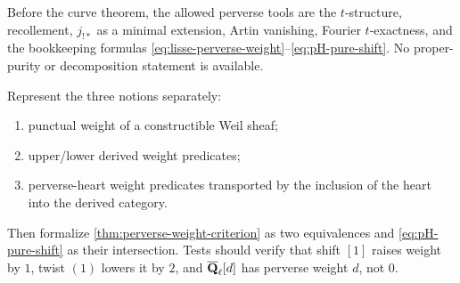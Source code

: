 \begin{perversebox}
Before the curve theorem, the allowed perverse tools are the \(t\)-structure,
recollement, \(j_{!*}\) as a minimal extension, Artin vanishing, Fourier
\(t\)-exactness, and the bookkeeping formulas
\eqref{eq:lisse-perverse-weight}--\eqref{eq:pH-pure-shift}.  No proper-purity
or decomposition statement is available.
\end{perversebox}

\begin{formalization}
Represent the three notions separately:
\begin{enumerate}
\item punctual weight of a constructible Weil sheaf;
\item upper/lower derived weight predicates;
\item perverse-heart weight predicates transported by the inclusion of the
      heart into the derived category.
\end{enumerate}
Then formalize \cref{thm:perverse-weight-criterion} as two equivalences and
\eqref{eq:pH-pure-shift} as their intersection.  Tests should verify that
shift \([1]\) raises weight by \(1\), twist \((1)\) lowers it by \(2\), and
\(\overline{\mathbf Q}_\ell[d]\) has perverse weight \(d\), not \(0\).
\end{formalization}
